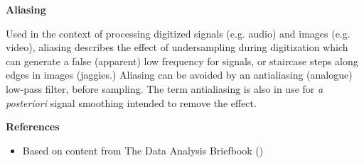 \documentclass[12pt]{article}
\begin{document}
{\bf Aliasing}

Used in the context of processing digitized signals (e.g. audio) and images (e.g. video), aliasing describes the effect of undersampling during digitization which can generate a false (apparent) low frequency for signals, or staircase steps along edges in images (jaggies.) Aliasing can be avoided by an antialiasing (analogue) low-pass filter, before sampling. The term antialiasing is also in use for \emph{a posteriori} signal smoothing intended to remove the effect.

{\bf References}

\begin{itemize}
\item Based on content from The Data Analysis Briefbook ()
\end{itemize}
\end{document}
